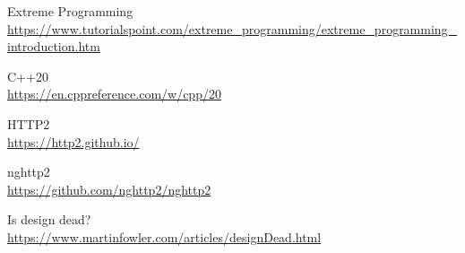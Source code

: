 \newpage
\begin{thebibliography}{Bibliografía}
Extreme Programming
\\\url{https://www.tutorialspoint.com/extreme_programming/extreme\_programming\_introduction.htm}

C++20
\\\url{https://en.cppreference.com/w/cpp/20}

HTTP2
\\\url{https://http2.github.io/}

nghttp2
\\\url{https://github.com/nghttp2/nghttp2}

Is design dead?
\\\url{https://www.martinfowler.com/articles/designDead.html}
\end{thebibliography}